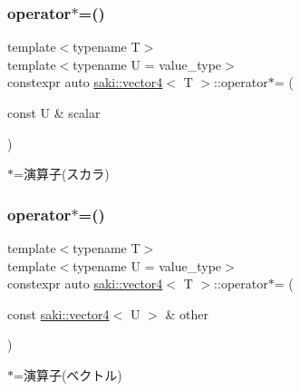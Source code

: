 \subsubsection{\texorpdfstring{operator$\ast$=()}{operator*=()}\hspace{0.1cm}{\footnotesize\ttfamily [1/2]}}
{\footnotesize\ttfamily template$<$typename T$>$ \\
template$<$typename U  = value\+\_\+type$>$ \\
constexpr auto \mbox{\hyperlink{classsaki_1_1vector4}{saki\+::vector4}}$<$ T $>$\+::operator$\ast$= (\begin{DoxyParamCaption}\item[{const U \&}]{scalar }\end{DoxyParamCaption})\hspace{0.3cm}{\ttfamily [inline]}}



$\ast$=演算子(スカラ) 

\mbox{\label{classsaki_1_1vector4_acf5408d6463791999ce594ef19c438a4}} 
\subsubsection{\texorpdfstring{operator$\ast$=()}{operator*=()}\hspace{0.1cm}{\footnotesize\ttfamily [2/2]}}
{\footnotesize\ttfamily template$<$typename T$>$ \\
template$<$typename U  = value\+\_\+type$>$ \\
constexpr auto \mbox{\hyperlink{classsaki_1_1vector4}{saki\+::vector4}}$<$ T $>$\+::operator$\ast$= (\begin{DoxyParamCaption}\item[{const \mbox{\hyperlink{classsaki_1_1vector4}{saki\+::vector4}}$<$ U $>$ \&}]{other }\end{DoxyParamCaption})\hspace{0.3cm}{\ttfamily [inline]}}



$\ast$=演算子(ベクトル) 

\mbox{\label{classsaki_1_1vector4_a05af0dc450cd074cdf247beb8a4ceedd}} 
